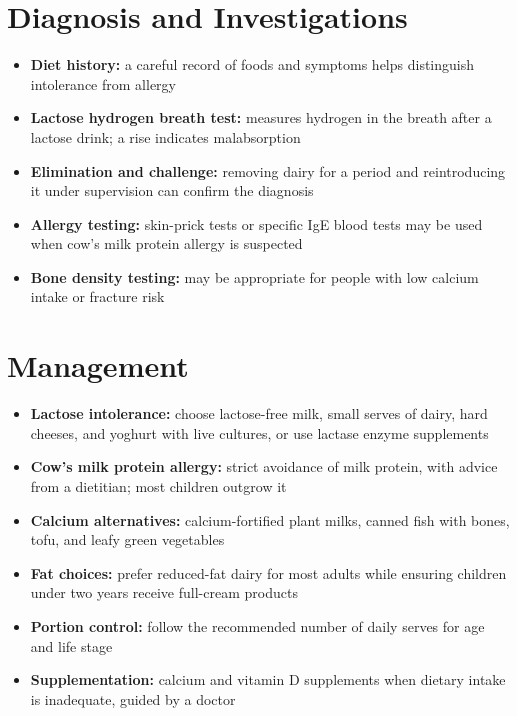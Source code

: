 \section*{Diagnosis and Investigations}
\begin{itemize}
    \item \textbf{Diet history:} a careful record of foods and symptoms helps distinguish intolerance from allergy
    \item \textbf{Lactose hydrogen breath test:} measures hydrogen in the breath after a lactose drink; a rise indicates malabsorption
    \item \textbf{Elimination and challenge:} removing dairy for a period and reintroducing it under supervision can confirm the diagnosis
    \item \textbf{Allergy testing:} skin-prick tests or specific IgE blood tests may be used when cow's milk protein allergy is suspected
    \item \textbf{Bone density testing:} may be appropriate for people with low calcium intake or fracture risk
\end{itemize}

\section*{Management}
\begin{itemize}
    \item \textbf{Lactose intolerance:} choose lactose-free milk, small serves of dairy, hard cheeses, and yoghurt with live cultures, or use lactase enzyme supplements
    \item \textbf{Cow's milk protein allergy:} strict avoidance of milk protein, with advice from a dietitian; most children outgrow it
    \item \textbf{Calcium alternatives:} calcium-fortified plant milks, canned fish with bones, tofu, and leafy green vegetables
    \item \textbf{Fat choices:} prefer reduced-fat dairy for most adults while ensuring children under two years receive full-cream products
    \item \textbf{Portion control:} follow the recommended number of daily serves for age and life stage
    \item \textbf{Supplementation:} calcium and vitamin D supplements when dietary intake is inadequate, guided by a doctor
\end{itemize}

